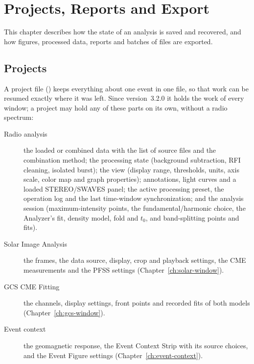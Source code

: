 \chapter{Projects, Reports and Export}
\label{ch:projects}

This chapter describes how the state of an analysis is saved and recovered, and how
figures, processed data, reports and batches of files are exported.

\section{Projects}
\label{sec:projects}

A project file () keeps everything about one event in one file, so that work
can be resumed exactly where it was left. Since version~3.2.0 it holds the work of every
window; a project may hold any of these parts on its own, without a radio spectrum:
\begin{description}
  \item[Radio analysis] the loaded or combined data with the list of source files and the
    combination method; the processing state (background subtraction, RFI cleaning, isolated
    burst); the view (display range, thresholds, units, axis scale, color map and graph
    properties); annotations, light curves and a loaded STEREO/SWAVES panel; the active
    processing preset, the operation log and the last time-window synchronization; and the
    analysis session (maximum-intensity points, the fundamental/harmonic choice, the
    Analyzer's fit, density model, fold and \(t_0\), and band-splitting points and fits).
  \item[Solar Image Analysis] the frames, the data source, display, crop and playback
    settings, the CME measurements and the PFSS settings (Chapter~\ref{ch:solar-window}).
  \item[GCS CME Fitting] the channels, display settings, front points and recorded fits of
    both models (Chapter~\ref{ch:gcs-window}).
  \item[Event context] the geomagnetic response, the Event Context Strip with its source
    choices, and the Event Figure settings (Chapter~\ref{ch:event-context}).
\end{description}

